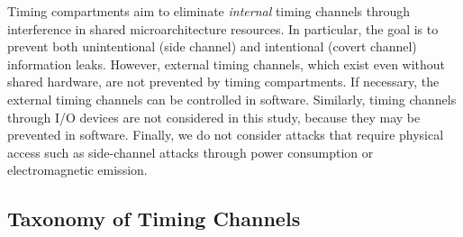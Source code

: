 
Timing compartments aim to eliminate {\em internal} timing channels through
interference in shared microarchitecture resources. In particular, the goal is
to prevent both unintentional (side channel) and intentional (covert channel)
information leaks.
However, external timing
channels, which exist even without shared hardware, are not prevented by
timing compartments. If necessary, the external timing channels can be 
controlled in software. Similarly, timing channels through I/O devices are not 
considered in this study,
because they may be prevented in software.
Finally, we do not consider attacks that require physical access such as
side-channel attacks through power consumption or electromagnetic emission.




\subsection{Taxonomy of Timing Channels}



